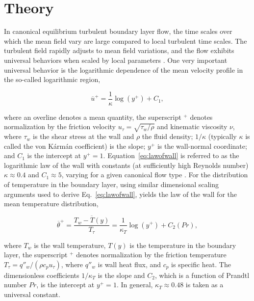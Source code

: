 \chapter{Theory}

In canonical equilibrium turbulent boundary layer flow, the time scales over which the mean field vary are large compared to local turbulent time scales. The turbulent field rapidly adjusts to mean field variations, and the flow exhibits universal behaviors when scaled by local parameters \cite{townsend1976}. One very important universal behavior is the logarithmic dependence of the mean velocity profile in the so-called logarithmic region,

\begin{equation}
{\overline u^+}=\frac{1}{\kappa}\log(y^+)+C_1, \label{eq:lawofwall}
\end{equation}

\noindent  where an overline denotes a mean quantity, the superscript $^+$ denotes normalization by the friction velocity $u_\tau = \sqrt{\tau_w / \rho}$ and kinematic viscosity $\nu$, where $\tau_w$ is the shear stress at the wall and $\rho$ the fluid density; $1/\kappa$ (typically $\kappa$ is called the von K\'{a}rm\'{a}n coefficient) is the slope; $y^+$ is the wall-normal coordinate; and $C_1$ is the intercept at $y^+ = 1$. Equation~\ref{eq:lawofwall} is referred to as the logarithmic law of the wall with constants (at sufficiently high Reynolds number) $\kappa\approx0.4$ and $C_1\approx5$, varying for a given canonical flow type \cite{Nagib2008}. For the distribution of temperature in the boundary layer, using similar dimensional scaling arguments used to derive Eq.~\ref{eq:lawofwall}, yields the law of the wall for the mean temperature distribution,

\begin{equation}
{\overline \theta^+ } =  \overline{\frac{T_w - T(y)}{T_\tau}} = \frac{1}{\kappa_T}\log(y^+)+C_2(Pr), \label{eq:lawofwallT}
\end{equation}

\noindent where $T_w$ is the wall temperature, $T(y)$ is the temperature in the boundary layer, the superscript $^+$ denotes normalization by the friction temperature $T_\tau = q''_w / (\rho c_p u_\tau)$, where $q''_w$ is wall heat flux, and $c_p$ is specific heat. The dimensionless coefficients $1/\kappa_T$ is the slope and $C_2$, which is a function of Prandtl number $Pr$, is the intercept at $y^+=1$. In general, $\kappa_T \approx 0.48$ is taken as a universal constant.  

